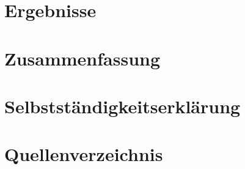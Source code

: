 \documentclass[a4paper, 12pt]{article}
\begin{document}
\section{Ergebnisse}
\label{sec:Ergebnisse}

\section{Zusammenfassung}
\label{sec:Zusammenfassung}

\newpage
\section{Selbstständigkeitserklärung}

\newpage
\section{Quellenverzeichnis}
%
\printbibliography[keyword={internet},title={Internetseiten?}]
\printbibliography[keyword={buch},title={Literatur}]
\end{document}
